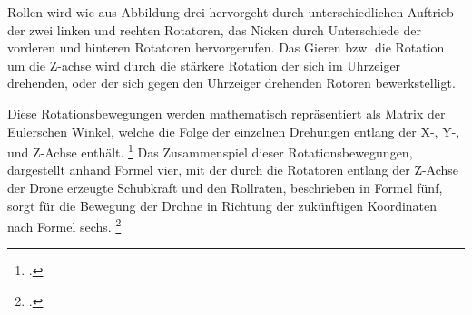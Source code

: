 Rollen wird wie aus Abbildung drei hervorgeht durch unterschiedlichen Auftrieb der zwei linken und rechten Rotatoren, das Nicken durch Unterschiede der vorderen und hinteren Rotatoren hervorgerufen.
Das Gieren bzw. die Rotation um die Z-achse wird durch die stärkere Rotation der sich im Uhrzeiger drehenden, oder der sich gegen den Uhrzeiger drehenden Rotoren bewerkstelligt. 

Diese Rotationsbewegungen werden mathematisch repräsentiert als Matrix der Eulerschen Winkel, welche die Folge der einzelnen Drehungen entlang der X-, Y-, und Z-Achse enthält. \footcite[Vgl.][S. 3]{Deshpande.2020}
Das Zusammenspiel dieser Rotationsbewegungen, dargestellt anhand Formel vier, mit der durch die Rotatoren entlang der Z-Achse der Drone erzeugte Schubkraft und den Rollraten, beschrieben in Formel fünf, sorgt für die Bewegung der Drohne in Richtung der zukünftigen Koordinaten nach Formel sechs. \footcite[Vgl.][S. 2]{Deshpande.2021}

